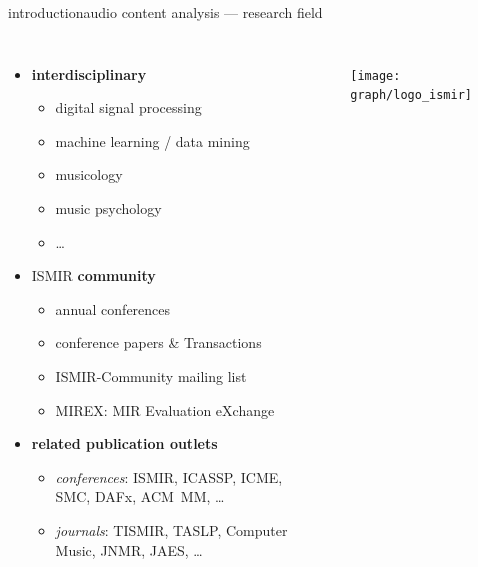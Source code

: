         \begin{frame}{introduction}{audio content analysis --- research field}
            \vspace{-7mm}
            \begin{columns}
            \begin{itemize}
                \item<1->   \textbf{interdisciplinary}
                    \begin{itemize}
                        \item   digital signal processing
                        \item   machine learning / data mining
                        \item   musicology
                        \item   music psychology
                        \item   \ldots
                    \end{itemize}
                \smallskip
                \item<2->   ISMIR \textbf{community}
                            \begin{itemize}
                                \item   annual conferences 
                                \item   conference papers \& Transactions
                                \item   ISMIR-Community mailing list
                                \item   MIREX: MIR Evaluation eXchange
                            \end{itemize}
                \smallskip
                \item<3->   \textbf{related publication outlets} 
                    \begin{itemize}
                        \item   \textit{conferences}: ISMIR, ICASSP, ICME, SMC, DAFx, ACM~MM, \ldots
                        \item   \textit{journals}: TISMIR, TASLP, Computer Music, JNMR, JAES, \ldots
                    \end{itemize}
            \end{itemize}
                \vspace{25mm}
                \begin{figure}
                    \texttt{[image: graph/logo\_ismir]}
                \end{figure}
            \end{columns}
        \end{frame}
